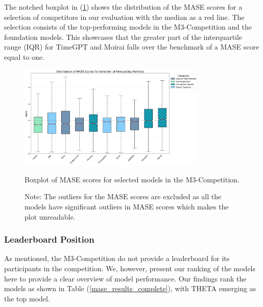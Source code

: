 \documentclass[12pt,a4paper]{article}
\begin{document}
The notched boxplot in (\ref{boxplot_mase_scores}) shows the distribution of the MASE scores for a selection of competitors in our evaluation with the median as a red line. The selection consists of the top-performing models in the M3-Competition and the foundation models. This showcases that the greater part of the interquartile range (IQR) for TimeGPT and Moirai falls over the benchmark of a MASE score equal to one.

\begin{figure}[htbp]
  \centering
  \includegraphics[width=0.8\textwidth]{boxplot_mase_scores.png}
  \caption{Boxplot of MASE scores for selected models in the M3-Competition.}
  \label{boxplot_mase_scores}
  \caption*{Note: The outliers for the MASE scores are excluded as all the models have significant outliers in MASE scores which makes the plot unreadable.}
\end{figure}

\subsubsection{Leaderboard Position}

As mentioned, the M3-Competition do not provide a leaderboard for its participants in the competition. We, however, present our ranking of the models here to provide a clear overview of model performance. Our findings rank the models as shown in Table (\ref{mase_results_complete}), with THETA emerging as the top model.
\end{document}
